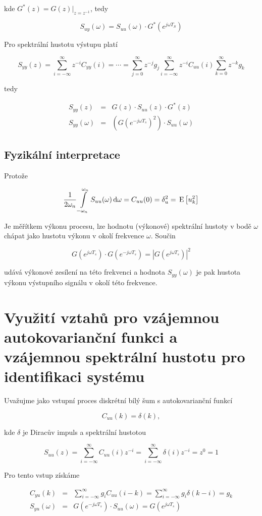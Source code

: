 kde $G^*(z)=G(z)|_{z=z^{-1}}$, tedy

\[ S_{uy}(\omega) = S_{uu}(\omega)\cdot G^*\left(e^{j\omega T_S}\right)  \]

Pro spektrální hustotu výstupu platí

\[ S_{yy}(z) = \sum_{i=-\infty}^\infty z^{-i}C_{yy}(i) = \cdots = \sum_{j=0}^\infty z^{-j}g_j \sum_{i=-\infty}^\infty z^{-i} C_{uu}(i)\sum_{k=0}^\infty z^{-k}g_k \]

tedy

\begin{eqnarray*}
S_{yy}(z) & = & G(z)\cdot S_{uu}(z)\cdot G^*(z)\\
S_{yy}(\omega) & = & \left(G\left(e^{-j\omega T_s}\right)^2\right)\cdot S_{uu}(\omega)
\end{eqnarray*}

\subsection{Fyzikální interpretace}
Protože 

\[ \frac{1}{2\omega_n}\int\limits_{-\omega_n}^{\omega_n}S_{uu}(\omega)\,\mathrm{d}\omega = C_{uu}(0)=\delta_u^2=\,\mathrm{E}\left[u_k^2\right] \]

Je měřítkem výkonu procesu, lze hodnotu (výkonové) spektrální hustoty v bodě $\omega$ chápat jako hustotu výkonu v okolí frekvence $\omega$. Součin

\[ G\left(e^{j\omega T_s}\right)\cdot G\left(e^{-j\omega T_s}\right) = \left|G\left(e^{j\omega T_s}\right)\right|^2 \]

udává výkonové zesílení na této frekvenci a hodnota $S_{yy}(\omega)$ je pak hustota výkonu výstupního signálu v okolí této frekvence.

\section{Využití vztahů pro vzájemnou autokovarianční funkci a vzájemnou spektrální hustotu pro identifikaci systému}

Uvažujme jako vstupní proces diskrétní bílý šum s autokovarianční funkcí

\[ C_{uu}(k) = \delta(k), \]

kde $\delta$ je Diracův impuls a spektrální hustotou

\[ S_{uu}(z) = \sum_{i=-\infty}^\infty C_{uu}(i)z^{-i} = \sum_{i=-\infty}^\infty \delta(i)z^{-i}=z^0=1 \]

Pro tento vstup získáme 

\begin{eqnarray*}
C_{yu}(k) & = & \sum_{i=-\infty}^\infty g_iC_{uu}(i-k) = \sum_{i=-\infty}^\infty g_i\delta(k-i)=g_k\\
S_{yu}(\omega) & = & G\left(e^{-j\omega T_s}\right)\cdot S_{uu}(\omega) = G\left(e^{j\omega T_s}\right)
\end{eqnarray*}

